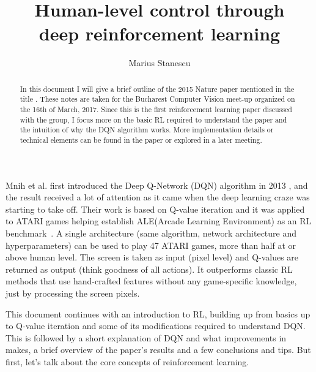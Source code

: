 \documentclass{tufte-handout}
\title{Human-level control through \\ deep reinforcement learning}
\author[Marius Stanescu]{Marius Stanescu}
\begin{document}
\maketitle%
\begin{abstract}
\noindent
In this document  I will give a brief outline of the 2015 Nature paper mentioned in the title  \cite{Mnih2015-fy}. These notes are taken for the Bucharest Computer Vision meet-up organized on the 16th of March, 2017. Since this is the first reinforcement learning paper discussed with the group, I focus more on the basic RL required to understand the paper and the intuition of why the DQN algorithm works. More implementation details or technical elements can be found in the paper or explored in a later meeting.

\end{abstract}
Mnih et al. first introduced the Deep Q-Network (DQN) algorithm in 2013 \cite[-0.5cm]{Mnih2013-ts}, and the result received a lot of attention as it came when the deep learning craze was starting to take off. Their work is based on Q-value iteration and it was applied to ATARI games helping establish ALE(Arcade Learning Environment) as an RL benchmark~\cite[0.2cm]{Bellemare2013-wj}. A single architecture (same algorithm, network architecture and hyperparameters) can be used to play 47 ATARI games, more than half at or above human level. The screen is taken as input (pixel level) and Q-values are returned as output (think goodness of all actions). It outperforms classic RL methods that use hand-crafted features without any game-specific knowledge, just by processing the screen pixels.

This document continues with an introduction to RL, building up from basics up to Q-value iteration and some of its modifications required to understand DQN. This is followed by a short explanation of DQN and what improvements in makes, a brief overview of the paper's results and a few conclusions and tips. But first, let's talk about the core concepts of reinforcement learning.
\end{document}
